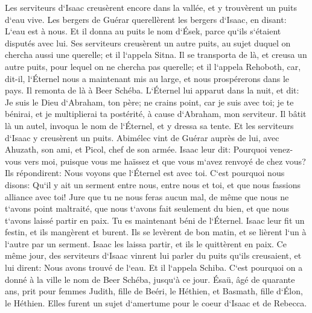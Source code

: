 \verse Les serviteurs d`Isaac creusèrent encore dans la vallée, et y trouvèrent un puits d`eau vive. 
\verse Les bergers de Guérar querellèrent les bergers d`Isaac, en disant: L`eau est à nous. Et il donna au puits le nom d`Ések, parce qu`ils s`étaient disputés avec lui. 
\verse Ses serviteurs creusèrent un autre puits, au sujet duquel on chercha aussi une querelle; et il l`appela Sitna. 
\verse Il se transporta de là, et creusa un autre puits, pour lequel on ne chercha pas querelle; et il l`appela Rehoboth, car, dit-il, l`Éternel nous a maintenant mis au large, et nous prospérerons dans le pays. 
\verse Il remonta de là à Beer Schéba. 
\verse L`Éternel lui apparut dans la nuit, et dit: Je suis le Dieu d`Abraham, ton père; ne crains point, car je suis avec toi; je te bénirai, et je multiplierai ta postérité, à cause d`Abraham, mon serviteur. 
\verse Il bâtit là un autel, invoqua le nom de l`Éternel, et y dressa sa tente. Et les serviteurs d`Isaac y creusèrent un puits. 
\verse Abimélec vint de Guérar auprès de lui, avec Ahuzath, son ami, et Picol, chef de son armée. 
\verse Isaac leur dit: Pourquoi venez-vous vers moi, puisque vous me haïssez et que vous m`avez renvoyé de chez vous? 
\verse Ils répondirent: Nous voyons que l`Éternel est avec toi. C`est pourquoi nous disons: Qu`il y ait un serment entre nous, entre nous et toi, et que nous fassions alliance avec toi! 
\verse Jure que tu ne nous feras aucun mal, de même que nous ne t`avons point maltraité, que nous t`avons fait seulement du bien, et que nous t`avons laissé partir en paix. Tu es maintenant béni de l`Éternel. 
\verse Isaac leur fit un festin, et ils mangèrent et burent. 
\verse Ils se levèrent de bon matin, et se lièrent l`un à l`autre par un serment. Isaac les laissa partir, et ils le quittèrent en paix. 
\verse Ce même jour, des serviteurs d`Isaac vinrent lui parler du puits qu`ils creusaient, et lui dirent: Nous avons trouvé de l`eau. 
\verse Et il l`appela Schiba. C`est pourquoi on a donné à la ville le nom de Beer Schéba, jusqu`à ce jour. 
\verse Ésaü, âgé de quarante ans, prit pour femmes Judith, fille de Beéri, le Héthien, et Basmath, fille d`Élon, le Héthien. 
\verse Elles furent un sujet d`amertume pour le coeur d`Isaac et de Rebecca. 

